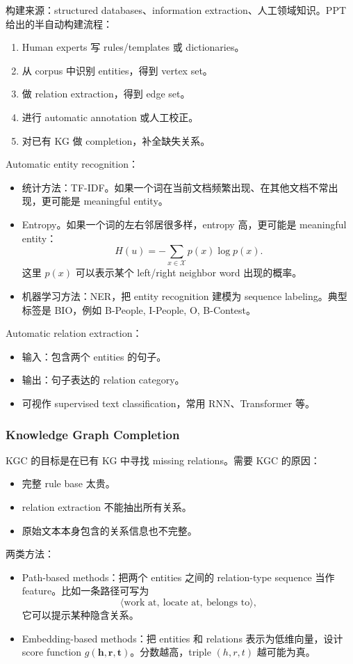 \documentclass[UTF8,11pt,a4paper]{ctexart}
\begin{document}
构建来源：structured databases、information extraction、人工领域知识。PPT 给出的半自动构建流程：
\begin{enumerate}
\item Human experts 写 rules/templates 或 dictionaries。
\item 从 corpus 中识别 entities，得到 vertex set。
\item 做 relation extraction，得到 edge set。
\item 进行 automatic annotation 或人工校正。
\item 对已有 KG 做 completion，补全缺失关系。
\end{enumerate}

Automatic entity recognition：
\begin{itemize}
\item 统计方法：TF-IDF。如果一个词在当前文档频繁出现、在其他文档不常出现，更可能是 meaningful entity。
\item Entropy。如果一个词的左右邻居很多样，entropy 高，更可能是 meaningful entity：
\[
H(u)=-\sum_{x\in\mathcal{X}}p(x)\log p(x).
\]
这里 $p(x)$ 可以表示某个 left/right neighbor word 出现的概率。
\item 机器学习方法：NER，把 entity recognition 建模为 sequence labeling。典型标签是 BIO，例如 B-People, I-People, O, B-Contest。
\end{itemize}

Automatic relation extraction：
\begin{itemize}
\item 输入：包含两个 entities 的句子。
\item 输出：句子表达的 relation category。
\item 可视作 supervised text classification，常用 RNN、Transformer 等。
\end{itemize}

\subsubsection{Knowledge Graph Completion}

KGC 的目标是在已有 KG 中寻找 missing relations。需要 KGC 的原因：
\begin{itemize}
\item 完整 rule base 太贵。
\item relation extraction 不能抽出所有关系。
\item 原始文本本身包含的关系信息也不完整。
\end{itemize}

两类方法：
\begin{itemize}
\item Path-based methods：把两个 entities 之间的 relation-type sequence 当作 feature。比如一条路径可写为
\[
\langle \text{work at},\ \text{locate at},\ \text{belongs to}\rangle,
\]
它可以提示某种隐含关系。
\item Embedding-based methods：把 entities 和 relations 表示为低维向量，设计 score function $g(\mathbf{h},\mathbf{r},\mathbf{t})$。分数越高，triple $(h,r,t)$ 越可能为真。
\end{itemize}
\end{document}
